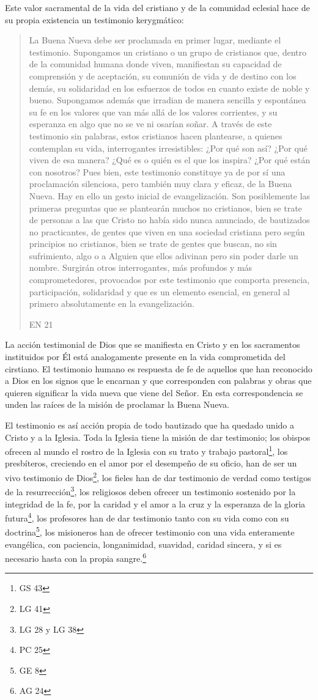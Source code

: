 Este valor sacramental de la vida del cristiano y de la comunidad eclesial hace
de su propia existencia un testimonio kerygmático:
\blockquote[EN 21]{La Buena Nueva debe ser proclamada en primer lugar, mediante
  el testimonio. Supongamos un cristiano o un grupo de cristianos que, dentro de
  la comunidad humana donde viven, manifiestan su capacidad de comprensión y de
  aceptación, su comunión de vida y de destino con los demás, su solidaridad en
  los esfuerzos de todos en cuanto existe de noble y bueno. Supongamos además
  que irradian de manera sencilla y espontánea su fe en los valores que van más
  allá de los valores corrientes, y su esperanza en algo que no se ve ni osarían
  soñar. A través de este testimonio sin palabras, estos cristianos hacen
  plantearse, a quienes contemplan su vida, interrogantes irresistibles: ¿Por
  qué son así? ¿Por qué viven de esa manera? ¿Qué es o quién es el que los
  inspira? ¿Por qué están con nosotros? Pues bien, este testimonio constituye ya
  de por sí una proclamación silenciosa, pero también muy clara y eficaz, de la
  Buena Nueva. Hay en ello un gesto inicial de evangelización. Son posiblemente
  las primeras preguntas que se plantearán muchos no cristianos, bien se trate
  de personas a las que Cristo no había sido nunca anunciado, de bautizados no
  practicantes, de gentes que viven en una sociedad cristiana pero según
  principios no cristianos, bien se trate de gentes que buscan, no sin
  sufrimiento, algo o a Alguien que ellos adivinan pero sin poder darle un
  nombre. Surgirán otros interrogantes, más profundos y más comprometedores,
  provocados por este testimonio que comporta presencia, participación,
  solidaridad y que es un elemento esencial, en general al primero absolutamente
  en la evangelización.}
La acción testimonial de Dios que se manifiesta en Cristo y en los sacramentos
instituidos por Él está analogamente presente en la vida comprometida del
cirstiano. El testimonio humano es respuesta de fe de aquellos que han
reconocido a Dios en los signos que le encarnan y que corresponden con palabras
y obras que quieren significar la vida nueva que viene del Señor. En esta
correspondencia se unden las raíces de la misión de proclamar la Buena Nueva.

El testimonio es así acción propia de todo bautizado que ha quedado unido a
Cristo y a la Iglesia.\autocite[Cf.][188]{prades2015testimonio} Toda la Iglesia
tiene la misión de dar testimonio; los obispos ofrecen al mundo el rostro de la
Iglesia con su trato y trabajo pastoral\footnote{GS 43}, los presbíteros,
creciendo en el amor por el desempeño de su oficio, han de ser un vivo
testimonio de Dios\footnote{LG 41}, los fieles han de dar testimonio de verdad
como testigos de la resurrección\footnote{LG 28 y LG 38}, los religiosos deben
ofrecer un testimonio sostenido por la integridad de la fe, por la caridad y el
amor a la cruz y la esperanza de la gloria futura\footnote{PC 25}, los
profesores han de dar testimonio tanto con su vida como con su
doctrina\footnote{GE 8}, los misioneros han de ofrecer testimonio con una vida
enteramente evangélica, con paciencia, longanimidad, suavidad, caridad sincera,
y si es necesario hasta con la propia sangre.\footnote{AG 24}

